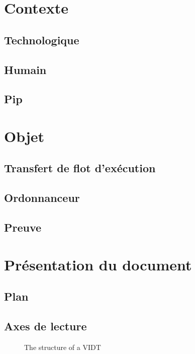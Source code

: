 
\section{Contexte}

\subsection{Technologique}

\subsection{Humain}

\subsection{Pip}

\section{Objet}

\subsection{Transfert de flot d'exécution}

\subsection{Ordonnanceur}

\subsection{Preuve}


\section{Présentation du document}

\subsection{Plan}

\subsection{Axes de lecture}


\begin{figure}
	\centering
	
	\caption{The structure of a VIDT}
	\label{fig:vidt}
\end{figure}

